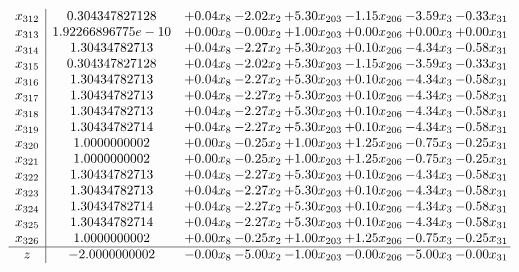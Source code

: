 \documentclass[8pt]{article}
\begin{document}
\[\begin{array}{c| c c@{\hskip 2pt} c@{\hskip 2pt} c@{\hskip 2pt} c@{\hskip 2pt} c@{\hskip 2pt} c@{\hskip 2pt} }
 x_{312}   &  0.304347827128 & +  0.04 x_{8} & -2.02 x_{2} & +  5.30 x_{203} & -1.15 x_{206} & -3.59 x_{3} & -0.33 x_{31}\\
 x_{313}   &  1.92266896775e-10 & +  0.00 x_{8} & -0.00 x_{2} & +  1.00 x_{203} & +  0.00 x_{206} & +  0.00 x_{3} & +  0.00 x_{31}\\
 x_{314}   &  1.30434782713 & +  0.04 x_{8} & -2.27 x_{2} & +  5.30 x_{203} & +  0.10 x_{206} & -4.34 x_{3} & -0.58 x_{31}\\
 x_{315}   &  0.304347827128 & +  0.04 x_{8} & -2.02 x_{2} & +  5.30 x_{203} & -1.15 x_{206} & -3.59 x_{3} & -0.33 x_{31}\\
 x_{316}   &  1.30434782713 & +  0.04 x_{8} & -2.27 x_{2} & +  5.30 x_{203} & +  0.10 x_{206} & -4.34 x_{3} & -0.58 x_{31}\\
 x_{317}   &  1.30434782713 & +  0.04 x_{8} & -2.27 x_{2} & +  5.30 x_{203} & +  0.10 x_{206} & -4.34 x_{3} & -0.58 x_{31}\\
 x_{318}   &  1.30434782713 & +  0.04 x_{8} & -2.27 x_{2} & +  5.30 x_{203} & +  0.10 x_{206} & -4.34 x_{3} & -0.58 x_{31}\\
 x_{319}   &  1.30434782714 & +  0.04 x_{8} & -2.27 x_{2} & +  5.30 x_{203} & +  0.10 x_{206} & -4.34 x_{3} & -0.58 x_{31}\\
 x_{320}   &  1.0000000002 & +  0.00 x_{8} & -0.25 x_{2} & +  1.00 x_{203} & +  1.25 x_{206} & -0.75 x_{3} & -0.25 x_{31}\\
 x_{321}   &  1.0000000002 & +  0.00 x_{8} & -0.25 x_{2} & +  1.00 x_{203} & +  1.25 x_{206} & -0.75 x_{3} & -0.25 x_{31}\\
 x_{322}   &  1.30434782713 & +  0.04 x_{8} & -2.27 x_{2} & +  5.30 x_{203} & +  0.10 x_{206} & -4.34 x_{3} & -0.58 x_{31}\\
 x_{323}   &  1.30434782713 & +  0.04 x_{8} & -2.27 x_{2} & +  5.30 x_{203} & +  0.10 x_{206} & -4.34 x_{3} & -0.58 x_{31}\\
 x_{324}   &  1.30434782714 & +  0.04 x_{8} & -2.27 x_{2} & +  5.30 x_{203} & +  0.10 x_{206} & -4.34 x_{3} & -0.58 x_{31}\\
 x_{325}   &  1.30434782714 & +  0.04 x_{8} & -2.27 x_{2} & +  5.30 x_{203} & +  0.10 x_{206} & -4.34 x_{3} & -0.58 x_{31}\\
 x_{326}   &  1.0000000002 & +  0.00 x_{8} & -0.25 x_{2} & +  1.00 x_{203} & +  1.25 x_{206} & -0.75 x_{3} & -0.25 x_{31}\\
\hline
z    &  -2.0000000002 & -0.00 x_{8} & -5.00 x_{2} & -1.00 x_{203} & -0.00 x_{206} & -5.00 x_{3} & -0.00 x_{31}\\
\end{array}\]
\end{document}
